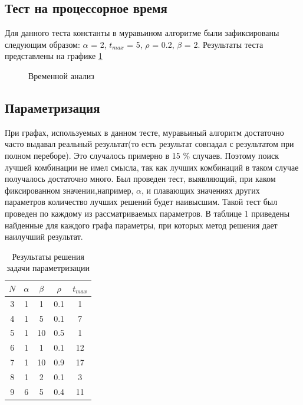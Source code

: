 \documentclass[a4paper, 14pt]{article}
\begin{document}
		\subsection{Тест на процессорное время}
		Для данного теста константы в муравьином алгоритме были зафиксированы следующим образом:
		$\alpha$ = 2, $t_{max}$ = 5, $\rho$ = 0.2, $\beta$ = 2.
		Результаты теста представлены на графике \ref{gr}
		        \begin{figure}[h]
        	\caption{Временной анализ}
        	\label{gr}
        \end{figure} 
		\subsection{Параметризация}
		При графах, используемых в данном тесте, муравьиный алгоритм достаточно часто выдавал реальный результат(то есть результат совпадал с результатом при полном переборе). Это случалось примерно в 15 \% случаев. Поэтому поиск лучшей комбинации не имел смысла, так как лучших комбинаций в таком случае получалось достаточно много. Был проведен тест, выявляющий, при каком фиксированном значении,например, $\alpha$, и плавающих значениях других параметров количество лучших решений будет наивысшим. Такой тест был проведен по каждому из рассматриваемых параметров. В таблице 1 приведены найденные для каждого графа параметры, при которых метод решения дает наилучший результат.
		
\begin{table}[h]\label{t1}
	\caption{Результаты решения задачи параметризации}
	\begin{center}
		
	\begin{tabular}{|c|c|c|c|c|}
		\hline
		$N$ & $\alpha$ &$\beta$ & $\rho$ & $t_{max}$ \\\hline
		3&1&1&0.1&1\\
		4&1&5&0.1&7\\
		 5&1&10&0.5&1\\
		 6&1&1&0.1&12\\
		 7&1&10&0.9&17\\
		 8&1&2&0.1&3\\
		 9&6&5&0.4&11\\
		 \hline
	\end{tabular}
\end{center}
\end{table}
\end{document}
